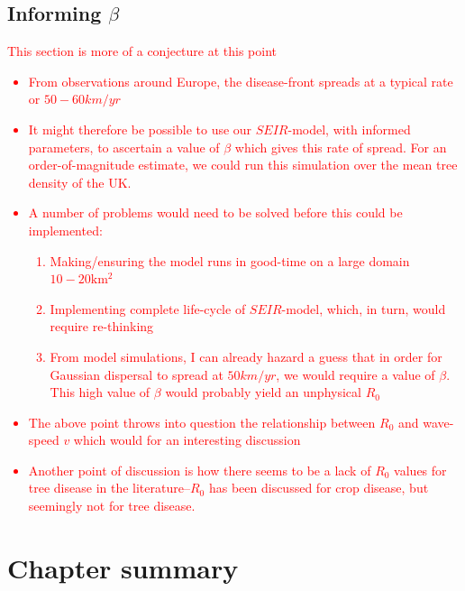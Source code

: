 \subsection{Informing $\beta$}
\textcolor{red}{
This section is more of a conjecture at this point
\begin{itemize}
    \item From observations around Europe, the disease-front spreads at a typical rate or $50-60 km/yr$
    \item It might therefore be possible to use our $SEIR$-model, with informed parameters, to ascertain a value of $\beta$ which gives this rate of spread. For an order-of-magnitude estimate, we could run this simulation over the mean tree density of the UK.
    \item A number of problems would need to be solved before this could be implemented: 
    \begin{enumerate}
        \item Making/ensuring the model runs in good-time on a large domain $10-20 \mathrm{km^2}$
        \item Implementing complete life-cycle of $SEIR$-model, which, in turn, would require re-thinking
        \item From model simulations, I can already hazard a guess that in order for Gaussian dispersal to spread at $50 km/yr$, we would require a value of $\beta$. This high value of $\beta$ would probably yield an unphysical $R_0$
    \end{enumerate}
    \item The above point throws into question the relationship between $R_0$ and wave-speed $v$ which would for an interesting discussion
    \item Another point of discussion is how there seems to be a lack of $R_0$ values for tree disease in the literature--$R_0$ has been discussed for crop disease, but seemingly not for tree disease. 
\end{itemize}
}

\section{Chapter summary}

